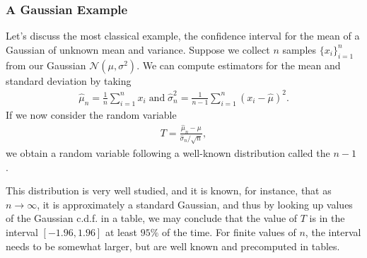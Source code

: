 \documentclass[letterpaper,11pt,english]{sphinxmanual}
\begin{document}
\subsubsection{A Gaussian Example}
\label{\detokenize{chapter_appendix_math/statistics:a-gaussian-example}}
Let’s discuss the most classical example, the confidence interval for
the mean of a Gaussian of unknown mean and variance. Suppose we collect
\(n\) samples \(\{x_i\}_{i=1}^n\) from our Gaussian
\(\mathcal{N}(\mu, \sigma^2)\). We can compute estimators for the
mean and standard deviation by taking
\begin{equation}\label{equation:chapter_appendix_math/statistics:chapter_appendix_math/statistics:4}
\begin{split}\hat\mu_n = \frac{1}{n}\sum_{i=1}^n x_i \;\text{and}\; \hat\sigma^2_n = \frac{1}{n-1}\sum_{i=1}^n (x_i - \hat\mu)^2.\end{split}
\end{equation}
If we now consider the random variable
\begin{equation}\label{equation:chapter_appendix_math/statistics:chapter_appendix_math/statistics:5}
\begin{split}T = \frac{\hat\mu_n - \mu}{\hat\sigma_n/\sqrt{n}},\end{split}
\end{equation}
we obtain a random variable following a well-known distribution called
the  \(n-1\) .

This distribution is very well studied, and it is known, for instance,
that as \(n\rightarrow \infty\), it is approximately a standard
Gaussian, and thus by looking up values of the Gaussian c.d.f. in a
table, we may conclude that the value of \(T\) is in the interval
\([-1.96, 1.96]\) at least \(95\%\) of the time. For finite
values of \(n\), the interval needs to be somewhat larger, but are
well known and precomputed in tables.
\end{document}
